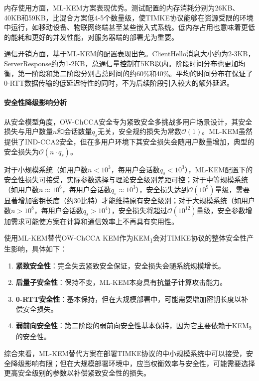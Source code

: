 内存使用方面，ML-KEM方案表现优秀。测试配置的内存消耗分别为26KB、40KB和59KB，比混合方案低4-5个数量级，使TIMKE协议能够在资源受限的环境中运行，如移动设备、物联网终端甚至某些嵌入式系统。低内存占用也意味着更低的能耗和更好的并发性能，对服务器端的部署尤为重要。

通信开销方面，基于ML-KEM的配置表现出色。ClientHello消息大小约为2-3KB，ServerResponse约为1-2KB，总通信量控制在5KB以内。阶段时间分布也更加均衡，第一阶段和第二阶段分别占总时间的约60\%和40\%。平均的时间分布在保证了0-RTT数据传输的低延迟特性的同时，不为后续阶段引入较大的额外延迟。

\paragraph{安全性降级影响分析}
从安全模型角度，OW-ChCCA安全专为紧致安全多挑战多用户场景设计，其安全损失与用户数量$n$和会话数量$q_s$无关，安全规约损失为常数$\mathcal{O}(1)$。ML-KEM虽然提供了IND-CCA2安全，但在多用户环境下其安全损失会随用户数量增加，典型的安全损失为$\mathcal{O}(n \cdot q_s)$。

对于小规模系统（如用户数$n < 10^3$，每用户会话数$q_s < 10^3$），ML-KEM配置下的安全性损失可接受，实际参数选择与理论安全级别差距可控；对于中等规模系统（如用户数$n \approx 10^6$，每用户会话数$q_s \approx 10^3$），安全损失达到$\mathcal{O}(10^9)$量级，需要显著增加密钥长度（约30比特）才能维持原有安全级别；对于大规模系统（如用户数$n > 10^8$，每用户会话数$q_s > 10^4$），安全损失将超过$\mathcal{O}(10^{12})$量级，安全参数增加需求可能使方案在计算和通信效率上不再具有实用性。


使用ML-KEM替代OW-ChCCA KEM作为KEM\textsubscript{1}会对TIMKE协议的整体安全性产生影响，具体如下：

\begin{enumerate}
    \item \textbf{紧致安全性}：完全失去紧致安全保证，安全损失会随系统规模增长。
    
    \item \textbf{后量子安全性}：保持不变，ML-KEM本身具有抗量子计算攻击能力。
    
    \item \textbf{0-RTT安全性}：基本保持，但在大规模部署中，可能需要增加密钥长度以补偿安全损失。
    
    \item \textbf{弱前向安全性}：第二阶段的弱前向安全性基本保持，因为它主要依赖于KEM\textsubscript{2}的安全性。
\end{enumerate}

综合来看，ML-KEM替代方案在部署TIMKE协议的中小规模系统中可以接受，安全降级影响有限；但在大规模部署环境中，应当权衡效率与安全性，可能需要选择更高安全级别的参数以补偿紧致安全性的损失。